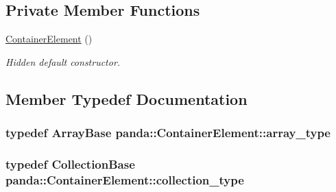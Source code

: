 \subsection*{Private Member Functions}
\begin{DoxyCompactItemize}
\item 
\hyperlink{classpanda_1_1ContainerElement_a2c38742b413977f0b50f84968ea9d5e8}{Container\-Element} ()
\begin{DoxyCompactList}\small\item\em Hidden default constructor. \end{DoxyCompactList}\end{DoxyCompactItemize}


\subsection{Member Typedef Documentation}
\hypertarget{classpanda_1_1ContainerElement_a1a6e0c3781940f68a54ffa9879c5b832}{
\subsubsection[{array\-\_\-type}]{\setlength{\rightskip}{0pt plus 5cm}typedef {\bf Array\-Base} {\bf panda\-::\-Container\-Element\-::array\-\_\-type}}}\label{classpanda_1_1ContainerElement_a1a6e0c3781940f68a54ffa9879c5b832}
\hypertarget{classpanda_1_1ContainerElement_a942f7fc985a476f786ca8d95a94233f8}{
\subsubsection[{collection\-\_\-type}]{\setlength{\rightskip}{0pt plus 5cm}typedef {\bf Collection\-Base} {\bf panda\-::\-Container\-Element\-::collection\-\_\-type}}}\label{classpanda_1_1ContainerElement_a942f7fc985a476f786ca8d95a94233f8}


